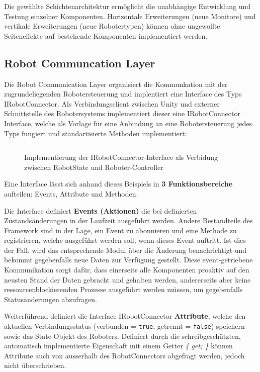 Die gewählte Schichtenarchitektur ermöglicht die unabhängige Entwicklung und
Testung einzelner Komponenten. Horizontale Erweiterungen (neue Monitore) und
vertikale Erweiterungen (neue Robotertypen) können ohne ungewollte
Seiteneffekte auf
bestehende Komponenten implementiert werden.

\subsection{Robot Communcation Layer}
Die Robot Communication Layer organisiert die Kommunkation mit der
zugrundeliegenden Robotersteuerung und
implentiert eine Interface des Typs IRobotConnector. Als Verbindungsclient
zwischen Unity und externer Schnittstelle des Robotersystems implementiert
dieser eine IRobotConnector Interface, welche als Vorlage für eine Anbindung an
eine Robotersteuerung jedes Typs fungiert und standartisierte Methoden
implementiert:

\begin{figure}[H]
  \inputminted[fontsize=\footnotesize]{csharp}{code-snippets/IRobotConnector.cs}
  \caption{Implementierung der IRobotConnector-Interface als Verbidung zwischen
  RobotState und Roboter-Controller}
\end{figure}

Eine Interface lässt sich anhand dieses Beispiels in \textbf{3
Funktionsbereiche} aufteilen: Events, Attribute und Methoden.

Die Interface definiert \textbf{Events (Aktionen)} die bei
definierten Zustandsänderungen
in der Laufzeit ausgeführt werden. Andere Bestandteile des Framework sind in der
Lage, ein Event zu abonnieren und eine Methode zu registrieren,
welche ausgeführt
werden soll, wenn dieses Event auftritt. Ist dies der Fall, wird das
entsprechende Modul über die Änderung benachrichtigt und bekommt gegebenfalls
neue Daten zur Verfügung gestellt. Diese event-getriebene Kommunikation sorgt
dafür, dass einerseits alle Komponenten proaktiv auf den neusten
Stand der Daten gebracht
und gehalten werden, andererseits aber keine ressourcenblockierenden Prozesse
ausgeführt werden müssen, um gegebenfalls Statusänderungen abzufragen.

Weiterführend definiert die Interface IRobotConnector
\textbf{Attribute}, welche den
aktuellen Verbindungsstatus (verbunden = \texttt{true}, getrennt =
\texttt{false}) speichern sowie das
State-Objekt des Roboters. Definiert durch die schreibgeschützten, automatisch
implementierte Eigenschaft mit einem Getter \textit{\{ get; \}} können Attribute
auch von ausserhalb des RobotConnectors abgefragt werden, jedoch nicht
überschrieben.

